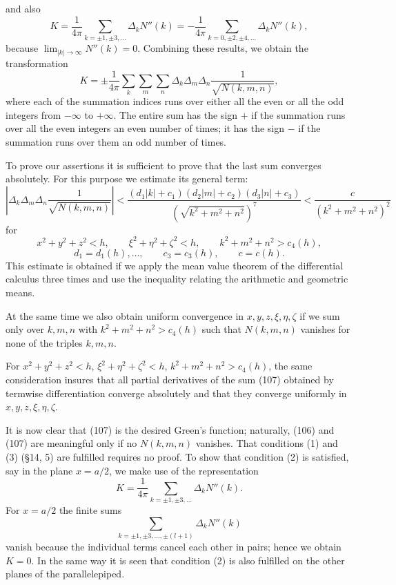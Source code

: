 and also
\[
K=\frac1{4\pi}\sum_{k=\pm1,\pm3,\ldots}\Delta_kN''(k)
=-\frac1{4\pi}\sum_{k=0,\pm2,\pm4,\ldots}\Delta_kN''(k),
\]
because $\lim_{|k|\to\infty}N''(k)=0$. Combining these results, we obtain the transformation
\begin{equation}\tag{107}
K=\pm\frac1{4\pi}\sum_k\sum_m\sum_n\Delta_k\Delta_m\Delta_n\frac1{\sqrt{N(k,m,n)}},
\end{equation}
where each of the summation indices runs over either all the even or all the odd integers from $-\infty$ to $+\infty$. The entire sum has the sign $+$ if the summation runs over all the even integers an even number of times; it has the sign $-$ if the summation runs over them an odd number of times.

To prove our assertions it is sufficient to prove that the last sum converges absolutely. For this purpose we estimate its general term:
\begin{equation}\tag{108}
\left|\Delta_k\Delta_m\Delta_n\frac1{\sqrt{N(k,m,n)}}\right|
<\frac{(d_1|k|+c_1)(d_2|m|+c_2)(d_3|n|+c_3)}{(\sqrt{k^2+m^2+n^2})^7}
<\frac{c}{(k^2+m^2+n^2)^2}
\end{equation}
for
\[
x^2+y^2+z^2<h,\qquad \xi^2+\eta^2+\zeta^2<h,\qquad k^2+m^2+n^2>c_4(h),
\]
\[
d_1=d_1(h),\ldots,\qquad c_3=c_3(h),\qquad c=c(h).
\]
This estimate is obtained if we apply the mean value theorem of the differential calculus three times and use the inequality relating the arithmetic and geometric means.

At the same time we also obtain uniform convergence in $x,y,z,\xi,\eta,\zeta$ if we sum only over $k,m,n$ with $k^2+m^2+n^2>c_4(h)$ such that $N(k,m,n)$ vanishes for none of the triples $k,m,n$.

For $x^2+y^2+z^2<h$, $\xi^2+\eta^2+\zeta^2<h$, $k^2+m^2+n^2>c_4(h)$, the same consideration insures that all partial derivatives of the sum (107) obtained by termwise differentiation converge absolutely and that they converge uniformly in $x,y,z,\xi,\eta,\zeta$.

It is now clear that (107) is the desired Green's function; naturally, (106) and (107) are meaningful only if no $N(k,m,n)$ vanishes. That conditions (1) and (3) (\S14, 5) are fulfilled requires no proof. To show that condition (2) is satisfied, say in the plane $x=a/2$, we make use of the representation
\[
K=\frac1{4\pi}\sum_{k=\pm1,\pm3,\ldots}\Delta_kN''(k).
\]
For $x=a/2$ the finite sums
\[
\sum_{k=\pm1,\pm3,\ldots,\pm(l+1)}\Delta_kN''(k)
\]
vanish because the individual terms cancel each other in pairs; hence we obtain $K=0$. In the same way it is seen that condition (2) is also fulfilled on the other planes of the parallelepiped.

